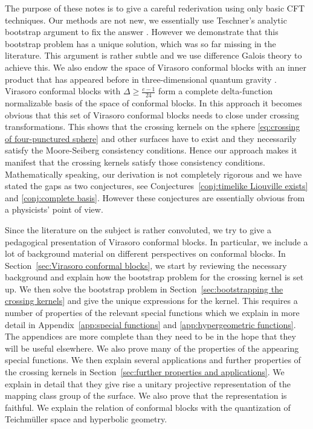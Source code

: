 \documentclass[12pt,a4paper]{article}
\begin{document}
The purpose of these notes is to give a careful rederivation using only basic CFT techniques. Our methods are not new, we essentially use Teschner's analytic bootstrap argument to fix the answer \cite{Teschner:1995yf, Ponsot:1999uf}. However we demonstrate that this bootstrap problem has a unique solution, which was so far missing in the literature. This argument is rather subtle and we use difference Galois theory to achieve this.
We also endow the space of Virasoro conformal blocks with an inner product that has appeared before in three-dimensional quantum gravity \cite{Verlinde:1989ua, Collier:2023fwi}. Virasoro conformal blocks with $\Delta \ge \frac{c-1}{24}$ form a complete delta-function normalizable basis of the space of conformal blocks. In this approach it becomes obvious that this set of Virasoro conformal blocks needs to close under crossing transformations. This shows that the crossing kernels on the sphere \eqref{eq:crossing of four-punctured sphere} and other surfaces have to exist and they necessarily satisfy the Moore-Seiberg consistency conditions. Hence our approach makes it manifest that the crossing kernels satisfy those consistency conditions. Mathematically speaking, our derivation is not completely rigorous and we have stated the gaps as two conjectures, see Conjectures~\ref{conj:timelike Liouville exists} and \ref{conj:complete basis}. However these conjectures are essentially obvious from a physicists' point of view.

Since the literature on the subject is rather convoluted, we try to give a pedagogical presentation of Virasoro conformal blocks. In particular, we include a lot of background material on different perspectives on conformal blocks. In Section~\ref{sec:Virasoro conformal blocks}, we start by reviewing the necessary background and explain how the bootstrap problem for the crossing kernel is set up. We then solve the bootstrap problem in Section~\ref{sec:bootstrapping the crossing kernels} and give the unique expressions for the kernel. This requires a number of properties of the relevant special functions which we explain in more detail in Appendix~\ref{app:special functions} and \ref{app:hypergeometric functions}. The appendices are more complete than they need to be in the hope that they will be useful elsewhere. We also prove many of the properties of the appearing special functions.
We then explain several applications and further properties of the crossing kernels in Section~\ref{sec:further properties and applications}. We explain in detail that they give rise a unitary projective representation of the mapping class group of the surface. We also prove that the representation is faithful. We explain the relation of conformal blocks with the quantization of Teichm\"uller space and hyperbolic geometry.
\end{document}
